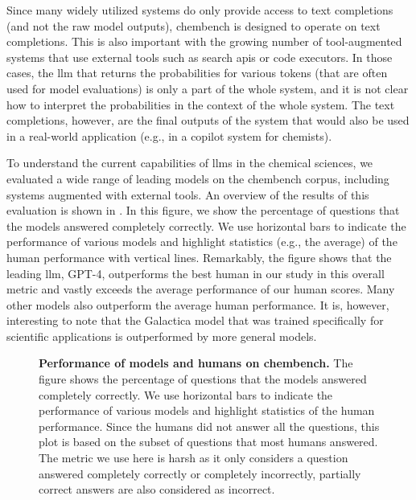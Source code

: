 \documentclass[11pt, oneside]{article}
\begin{document}
Since many widely utilized systems do only provide access to text completions (and not the raw model outputs), chembench is designed to operate on text completions.
This is also important with the growing number of tool-augmented systems that use external tools such as search \glspl{api} or code executors.\cite{schick2024toolformer, karpas2022mrkl, yao2022react}
In those cases, the \gls{llm} that returns the probabilities for various tokens (that are often used for model evaluations\cite{Fourrier_Habib_Launay_Wolf}) is only a part of the whole system, and it is not clear how to interpret the probabilities in the context of the whole system.
The text completions, however, are the final outputs of the system that would also be used in a real-world application (e.g., in a copilot system for chemists).

To understand the current capabilities of \glspl{llm} in the chemical sciences, we evaluated a wide range of leading models\cite{Huggingface} on the chembench corpus, including systems augmented with external tools.
An overview of the results of this evaluation is shown in . 
In this figure, we show the percentage of questions that the models answered completely correctly.
We use horizontal bars to indicate the performance of various models and highlight statistics (e.g., the average) of the human performance with vertical lines.
Remarkably, the figure shows that the leading \gls{llm}, GPT-4, outperforms the best human in our study in this overall metric and vastly exceeds the average performance of our human scores.
Many other models also outperform the average human performance. It is, however, interesting to note that the Galactica model that was trained specifically for scientific applications is outperformed by more general models.

\begin{figure}
    \centering
    \caption{\textbf{Performance of models and humans on chembench.} The figure shows the percentage of questions that the models answered completely correctly. We use horizontal bars to indicate the performance of various models and highlight statistics of the human performance. 
    Since the humans did not answer all the questions, this plot is based on the subset of questions that most humans answered.
    The metric we use here is harsh as it only considers a question answered completely correctly or completely incorrectly, partially correct answers are also considered as incorrect.}
    \label{fig:human_vs_models_bar}
\end{figure}
\end{document}
